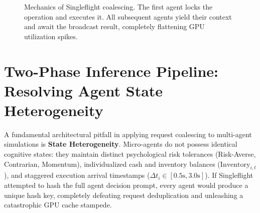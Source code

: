 \begin{figure}[htbp]
\centering
{}
\caption{Mechanics of Singleflight coalescing. The first agent locks the operation and executes it. All subsequent agents yield their context and await the broadcast result, completely flattening GPU utilization spikes.}
\label{fig:singleflight_detail}
\end{figure}

\section{Two-Phase Inference Pipeline: Resolving Agent State Heterogeneity}

A fundamental architectural pitfall in applying request coalescing to multi-agent simulations is \textbf{State Heterogeneity}. Micro-agents do not possess identical cognitive states: they maintain distinct psychological risk tolerances (Risk-Averse, Contrarian, Momentum), individualized cash and inventory balances ($\text{Inventory}_{i, t}$), and staggered execution arrival timestamps ($\Delta t_i \in [0.5\text{s}, 3.0\text{s}]$). If Singleflight attempted to hash the full agent decision prompt, every agent would produce a unique hash key, completely defeating request deduplication and unleashing a catastrophic GPU cache stampede.

